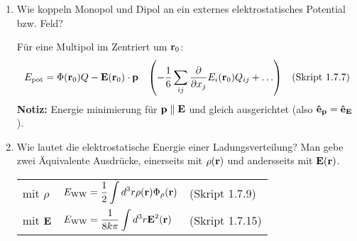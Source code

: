 \begin{enumerate}
  \item Wie koppeln Monopol und Dipol an ein externes elektrostatisches
        Potential bzw. Feld?
        
        Für eine Multipol im Zentriert um $\vb r_0$:
        $$E_{\text{pot}}=\Phi(\vb r_0)Q-\vb E(\vb r_0)\cdot\vb p 
        \quad\qty(-\frac{1}{6}\sum_{ij}\pdv{x_j}E_i(\vb r_0)Q_{ij}
        +\ldots)
        \quad\text{(Skript 1.7.7)}$$
        \textbf{Notiz:} Energie minimierung für $\vb p\parallel \vb E$
        und gleich ausgerichtet (also $\vu e_{\vb p}=\vu e_{\vb E}$).\\

  \clearpage
  \item Wie lautet die elektrostatische Energie einer Ladungsverteilung?
        Man gebe zwei Äquivalente Ausdrücke, einerseits mit $\rho(\vb r)$
        und andersseits mit $\vb E(\vb r)$.
        \begin{center}
        \begin{tabular}{lll}
          mit $\rho$    & $\displaystyle E_{\text{WW}}=
                          \frac{1}{2}\int d^3 r\rho(\vb r)
                          \Phi_\rho(\vb r)$
                            &(Skript 1.7.9)\\
          mit $\vb E$   & $\displaystyle E_{\text{WW}}=\frac{1}{8k\pi}
                           \int d^3 r\vb E^2(\vb r)$
                            &(Skript 1.7.15)\\
        \end{tabular}
        \end{center}


\end{enumerate}
